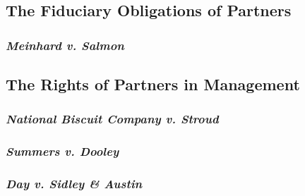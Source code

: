 \subsection{The Fiduciary Obligations of Partners}

\subsubsection{\emph{Meinhard v. Salmon}}


\subsection{The Rights of Partners in Management}

\subsubsection{\emph{National Biscuit Company v. Stroud}}


\subsubsection{\emph{Summers v. Dooley}}


\subsubsection{\emph{Day v. Sidley \& Austin}}


